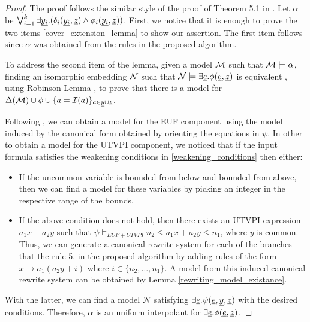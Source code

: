 \begin{proof}
  The proof follows the similar style of the proof of Theorem 
  5.1 in \cite{ghilardi2020compactly}.
  Let $\alpha$ be 
  $\bigvee_{i=1}^k \exists \underline{y_i} . (\delta_i(\underline{y_i}, \underline{z}) \land \phi_i(\underline{y_i}, \underline{z}))$.
  First, we notice that it is enough to prove the 
  two items \ref{cover_extension_lemma} to show 
  our assertion. The first item 
  follows since $\alpha$ was obtained from the rules 
  in the proposed algorithm.

  To address the second item of the lemma, given a
  model $\cal{M}$ such that $\cal{M} \models \alpha$, finding
  an isomorphic embedding $\cal{N}$ such that $\mathcal{N} \models
  \exists \underline{e} . \phi(\underline{e}, \underline{z})$ is equivalent
  , using Robinson Lemma \cite{chang2013model}, to prove that
  there is a model for $\Delta(\mathcal{M}) 
  \cup \phi 
  \cup \{ a = \mathcal{I}(a)\}_{a \in \underline{y} \cup \underline{z}}$.

  Following \cite{ghilardi2020compactly}, we can obtain 
  a model for the
  EUF component using the model induced by the canonical 
  form obtained by orienting the equations in $\psi$. 
  In other to obtain a model for the 
  UTVPI component, we noticed that if the 
  input formula satisfies the weakening 
  conditions in \ref{weakening_conditions}
  then either:
  \begin{itemize}
      \item If the uncommon variable is bounded 
        from below and 
        bounded from above, 
        then we can find a model for these variables
        by picking an integer
        in the respective range of the bounds.
      \item If the above condition does not
        hold, then there exists an UTVPI expression 
        $a_1 x + a_2 y$ such that
        $\psi \models_{EUF + UTVPI} n_2 \leq 
        a_1 x + a_2 y \leq n_1$, where $y$ is common.
        Thus, we can generate a canonical rewrite
        system for each of the branches that the
        rule 5. in the proposed algorithm by 
        adding rules of the form 
        $x \rightarrow a_1(a_2 y + i)$ where
        $i \in \{n_2, \dots, n_1\}$. A model 
        from this induced canonical rewrite system 
        can be obtained by Lemma 
        \ref{rewriting_model_existance}.
  \end{itemize}
  
  With the latter, we can find a model $\mathcal{N}$
  satisfying $\exists \underline{e} . 
  \psi(\underline{e}, \underline{y}, \underline{z})$
  with the desired conditions. 
  Therefore, $\alpha$ is an uniform interpolant
  for $\exists \underline{e}. \phi(\underline{e}, \underline{z})$.

\end{proof}



